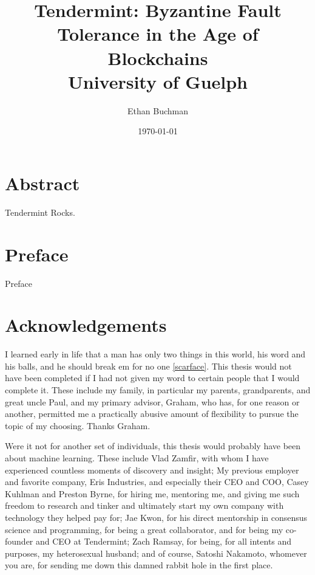 \documentclass[12pt]{report}
\begin{document}
\title{
	{Tendermint: Byzantine Fault Tolerance in the Age of Blockchains}\\
	{\large University of Guelph}\\
}

\author{Ethan Buchman}
\date{\today}

\maketitle

\clearpage
\thispagestyle{plain}
\par\vspace*{.35\textheight}{\centering Dedicated to Theda. \par}

\chapter*{Abstract}
Tendermint Rocks.

\chapter*{Preface}
Preface

\chapter*{Acknowledgements}
I learned early in life that a man has only two things in this world, his word and his balls, and he should break em for no one \ref{scarface}. 
This thesis would not have been completed if I had not given my word to certain people that I would complete it.
These include my family, in particular my parents, grandparents, and great uncle Paul, and my primary advisor, Graham,
who has, for one reason or another, permitted me a practically abusive amount of flexibility to pursue the topic of my choosing.
Thanks Graham.

Were it not for another set of individuals, this thesis would probably have been about machine learning.
These include Vlad Zamfir, with whom I have experienced countless moments of discovery and insight;
My previous employer and favorite company, Eris Industries, and especially their CEO and COO, Casey Kuhlman and Preston Byrne,
for hiring me, mentoring me, and giving me such freedom to research and tinker and ultimately start my own company with technology they helped pay for;
Jae Kwon, for his direct mentorship in consensus science and programming, for being a great collaborator, and for being my co-founder and CEO at Tendermint;
Zach Ramsay, for being, for all intents and purposes, my heterosexual husband;
and of course, Satoshi Nakamoto, whomever you are, for sending me down this damned rabbit hole in the first place.
\end{document}

